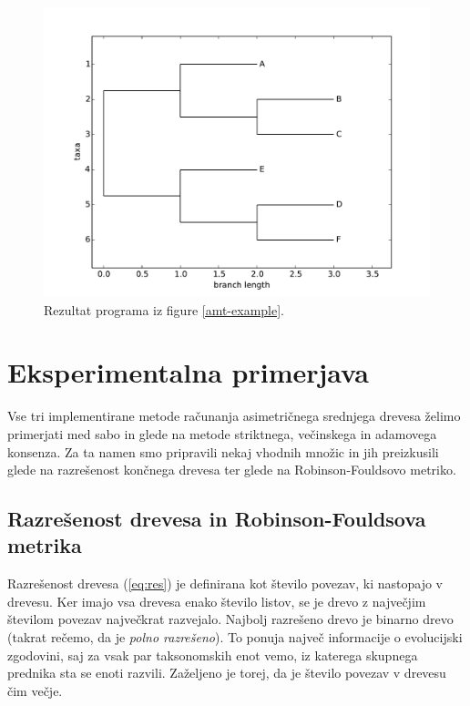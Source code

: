 \documentclass[a4paper, 12pt]{book}
\begin{document}
\begin{figure}[h!]
	\begin{center}
		\includegraphics[scale=0.65, clip=true, trim=1cm 0 1cm 1cm]{gfx/ex_b.pdf}
	\end{center}
	\caption{Rezultat programa iz figure \ref{amt-example}.}
	\label{img-example-output}
\end{figure}

\chapter{Eksperimentalna primerjava}

Vse tri implementirane metode računanja asimetričnega srednjega drevesa želimo primerjati med sabo in glede na metode striktnega, večinskega in adamovega konsenza. Za ta namen smo pripravili nekaj vhodnih množic in jih preizkusili glede na razrešenost končnega drevesa ter glede na Robinson-Fouldsovo metriko. 

\section{Razrešenost drevesa in Robinson-Fouldsova metrika}
Razrešenost drevesa (\ref{eq:res}) je definirana kot število povezav, ki nastopajo v drevesu. Ker imajo vsa drevesa enako število listov, se je drevo z največjim številom povezav največkrat razvejalo. Najbolj razrešeno drevo je binarno drevo (takrat rečemo, da je {\it polno razrešeno}). To ponuja največ informacije o evolucijski zgodovini, saj za vsak par taksonomskih enot vemo, iz katerega skupnega prednika sta se enoti razvili. Zaželjeno je torej, da je število povezav v drevesu čim večje.
\end{document}
